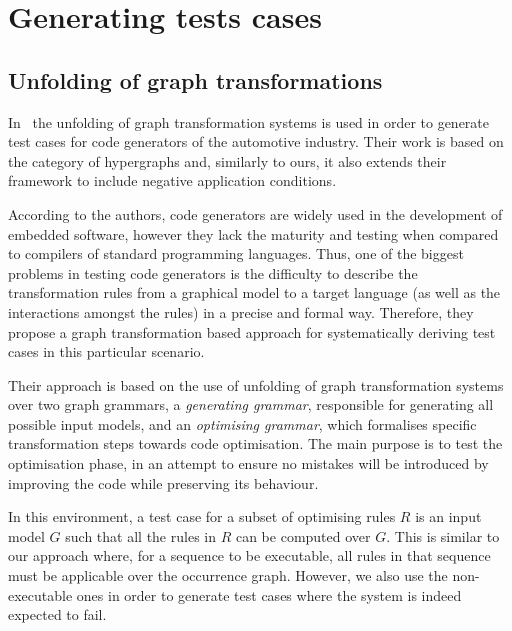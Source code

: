 
\section{Generating tests cases}

\subsection{Unfolding of graph transformations}

  In~\cite{Baldan2004} the unfolding of graph transformation systems is used in order to generate test cases for code generators of the automotive industry.
  Their work is based on the category of hypergraphs and, similarly to ours, it also extends their framework to include negative application conditions.

  According to the authors, code generators are widely used in the development of embedded software, however they lack the maturity and testing when compared to compilers of standard programming languages.
  Thus, one of the biggest problems in testing code generators is the difficulty to describe the transformation rules from a graphical model to a target language (as well as the interactions amongst the rules) in a precise and formal way.
  Therefore, they propose a graph transformation based approach for systematically deriving test cases in this particular scenario.

Their approach is based on the use of unfolding of graph transformation systems~\cite{Ribeiro1996} over two graph grammars, a \textit{generating grammar}, responsible for generating all possible input models, and an \textit{optimising grammar}, which formalises specific transformation steps towards code optimisation.
The main purpose is to test the optimisation phase, in an attempt to ensure no mistakes will be introduced by improving the code while preserving its behaviour.


In this environment, a test case for a subset of optimising rules $R$ is an input model $G$ such that all the rules in $R$ can be computed over $G$. This is similar to our approach where, for a sequence to be executable, all rules in that sequence must be applicable over the occurrence graph. However, we also use the non-executable ones in order to generate test cases where the system is indeed expected to fail.

